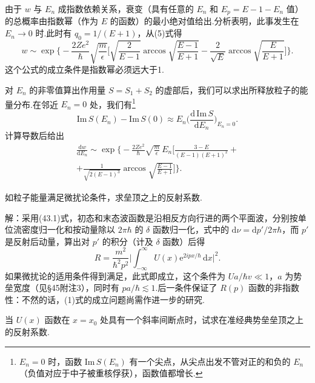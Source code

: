 \begin{xiti}
由于 $w$ 与 $E_n$ 成指数依赖关系，衰变（具有任意的 $E_n$ 和 $E_p=E-1-E_n$ 值）的总概率由指数幂（作为 $E$ 的函数）的最小绝对值给出.分析表明，此事发生在 $E_n\to0$ 时.此时有 $q_0=1/(E+1)$，从(5)式得
\begin{equation*}
  w\sim\exp\bigg\{-\frac{2Ze^2}{\hbar}\sqrt{\frac{m}{\epsilon}}
  \bigg[\sqrt{\frac{2}{E-1}}\operatorname{arccos}\sqrt{\frac{E-1}{E+1}}
  -\frac{2}{\sqrt{E}}\operatorname{arccos}\sqrt{\frac{E}{E+1}}\bigg]\bigg\}.
\end{equation*}
这个公式的成立条件是指数幂必须远大于1.

对 $E_n$ 的非零值算出作用量 $S=S_1+S_2$ 的虚部后，我们可以求出所释放粒子的能量分布.在邻近 $E_n=0$ 处，我们有\footnote{$E_n=0$ 时，函数 $\mathrm{Im}\,S(E_n)$ 有一个尖点，从尖点出发不管对正的和负的 $E_n$（负值对应于中子被重核俘获），函数值都增长.}
\begin{equation*}
  \mathrm{Im}\,S(E_n)-\mathrm{Im}\,S(0)\approx E_n
  \bigg(\frac{\mathrm{d}\,\mathrm{Im}\,S}{\mathrm{d}E_n}\bigg)_{E_n=0}.
\end{equation*}
计算导数后给出
\begin{equation*}
\begin{aligned}
  \frac{\mathrm{d}w}{\mathrm{d}E_n}\sim\exp\bigg\{-\frac{2Ze^2}{\hbar}\sqrt{\frac{m}{\epsilon}}\,
  E_n\bigg[\frac{3-E}{(E-1)(E+1)^2}+\\
  +\frac{1}{\sqrt{2(E-1)^3}}\operatorname{arccos}\sqrt{\frac{E-1}{E+1}}\bigg]\bigg\}.
\end{aligned}
\end{equation*}

\quad 如粒子能量满足微扰论条件，求垒顶之上的反射系数.

解：采用(43.1)式，初态和末态波函数是沿相反方向行进的两个平面波，分别按单位流密度归一化和按动量除以 $2\pi\hbar$ 的 $\delta$ 函数归一化，式中的 $\mathrm{d}\nu=\mathrm{d}p'/2\pi\hbar$，而 $p'$ 是反射后动量，算出对 $p'$ 的积分（计及 $\delta$ 函数）后得
\setcounter{equation}{0}%
\begin{equation}
  R=\frac{m^2}{\hbar^2p^2}\bigg|\int_{-\infty}^{\infty}U(x)\mathrm{e}^{2ipx/\hbar}\,\mathrm{d}x\bigg|^2.
\end{equation}
如果微扰论的适用条件得到满足，此式即成立，这个条件为 $Ua/\hbar v\ll1$，$a$ 为势垒宽度（见§45附注3），同时有 $pa/\hbar\lesssim1$.后一条件保证了 $R(p)$ 函数的非指数性：不然的话，(1)式的成立问题尚需作进一步的研究.

\quad 当 $U(x)$ 函数在 $x=x_0$ 处具有一个斜率间断点时，试求在准经典势垒垒顶之上的反射系数.


\end{xiti}
